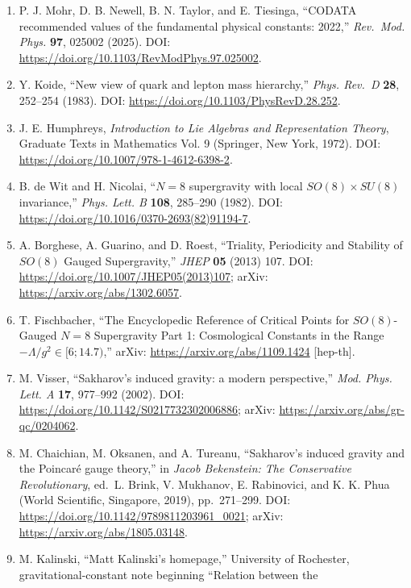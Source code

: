 \documentclass[
  11pt,
  letterpaper,
  twocolumn,
]{article}
\begin{document}
\begin{sloppypar}
\begin{enumerate}
\def\labelenumi{\arabic{enumi}.}
\item
  P. J. Mohr, D. B. Newell, B. N. Taylor, and E. Tiesinga, ``CODATA
  recommended values of the fundamental physical constants: 2022,''
  \emph{Rev.~Mod. Phys.} \textbf{97}, 025002 (2025). DOI:
  \url{https://doi.org/10.1103/RevModPhys.97.025002}.
\item
  Y. Koide, ``New view of quark and lepton mass hierarchy,'' \emph{Phys.
  Rev.~D} \textbf{28}, 252--254 (1983). DOI:
  \url{https://doi.org/10.1103/PhysRevD.28.252}.
\item
  J. E. Humphreys, \emph{Introduction to Lie Algebras and Representation
  Theory}, Graduate Texts in Mathematics Vol. 9 (Springer, New York,
  1972). DOI: \url{https://doi.org/10.1007/978-1-4612-6398-2}.
\item
  B. de Wit and H. Nicolai, ``\(N=8\) supergravity with local
  \(SO(8)\times SU(8)\) invariance,'' \emph{Phys. Lett. B} \textbf{108},
  285--290 (1982). DOI: \url{https://doi.org/10.1016/0370-2693(82)91194-7}.
\item
  A. Borghese, A. Guarino, and D. Roest, ``Triality, Periodicity and
  Stability of \(SO(8)\) Gauged Supergravity,'' \emph{JHEP} \textbf{05}
  (2013) 107. DOI: \url{https://doi.org/10.1007/JHEP05(2013)107}; arXiv:
  \url{https://arxiv.org/abs/1302.6057}.
\item
  T. Fischbacher, ``The Encyclopedic Reference of Critical Points for
  \(SO(8)\)-Gauged \(N=8\) Supergravity Part 1: Cosmological Constants
  in the Range \(-\Lambda/g^2 \in [6;14.7)\),'' arXiv:
  \url{https://arxiv.org/abs/1109.1424} [hep-th].
\item
  M. Visser, ``Sakharov's induced gravity: a modern perspective,''
  \emph{Mod. Phys. Lett. A} \textbf{17}, 977--992 (2002). DOI:
  \url{https://doi.org/10.1142/S0217732302006886}; arXiv:
  \url{https://arxiv.org/abs/gr-qc/0204062}.
\item
  M. Chaichian, M. Oksanen, and A. Tureanu, ``Sakharov's induced gravity
  and the Poincaré gauge theory,'' in \emph{Jacob Bekenstein: The
  Conservative Revolutionary}, ed.~L. Brink, V. Mukhanov, E. Rabinovici,
  and K. K. Phua (World Scientific, Singapore, 2019), pp.~271--299. DOI:
  \url{https://doi.org/10.1142/9789811203961_0021}; arXiv:
  \url{https://arxiv.org/abs/1805.03148}.
\item
  M. Kalinski, ``Matt Kalinski's homepage,'' University of Rochester,
  gravitational-constant note beginning ``Relation between the

\end{enumerate}
\end{sloppypar}
\end{document}
